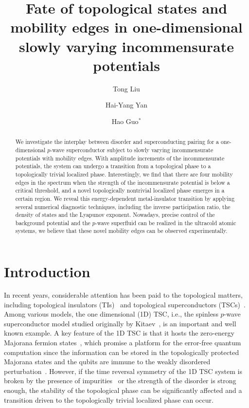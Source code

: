 \documentclass[prb,showpacs,twocolumn,aps,superscriptaddress,a4paper]{revtex4-1}
\begin{document}
\title{Fate of topological states and mobility edges in one-dimensional slowly varying incommensurate potentials}

\author{Tong Liu}
\author{Hai-Yang Yan}
\author{Hao Guo$^*$}




\begin{abstract}
We investigate the interplay between disorder and superconducting pairing for a
one-dimensional $p$-wave superconductor subject to slowly varying incommensurate potentials with mobility edges. With amplitude increments of the incommensurate potentials, the system can undergo a transition from a topological phase to a topologically trivial localized phase. Interestingly, we find that there are four mobility edges in the spectrum when the strength of the incommensurate potential is below a critical threshold, and a novel topologically nontrivial localized phase emerges in a certain region. We reveal this energy-dependent metal-insulator transition by applying several numerical diagnostic techniques, including the inverse participation ratio, the density of states and the Lyapunov exponent. Nowadays, precise control of the background potential and the $p$-wave superfluid can be realized in the ultracold atomic systems, we believe that these novel
mobility edges can be observed experimentally.

\end{abstract}

\maketitle

\section{Introduction}
\label{n1}
In recent years, considerable attention has been paid to the topological matters, including topological insulators (TIs)~\cite{K1,Zh2} and topological superconductors (TSCs)~\cite{K3,I4}. Among  various models, the one dimensional (1D) TSC, i.e., the spinless $p$-wave superconductor model studied originally by Kitaev~\cite{K3}, is an important and well known example. A key feature of the 1D TSC is that it hosts the zero-energy Majorana fermion states~\cite{S5,K6,Lu7}, which promise a platform for the error-free quantum computation since the information can be stored in the topologically protected Majorana states and the qubits are immune to the weakly disordered perturbation~\cite{P8}. However, if the time reversal symmetry of the 1D TSC system is broken by the presence of impurities~\cite{A9} or the strength of the disorder is strong enough, the stability of the topological phase can be significantly affected and a transition driven to the topologically trivial localized phase can occur.
\end{document}
